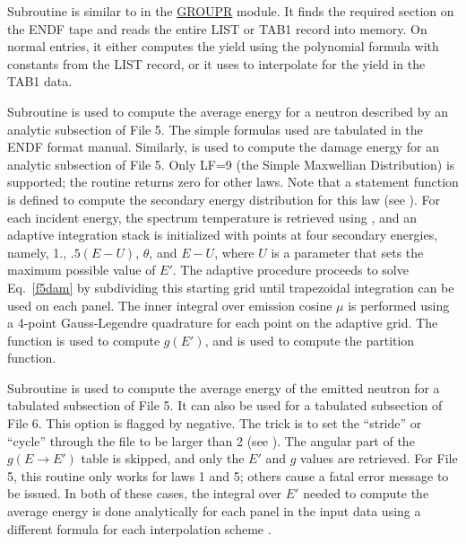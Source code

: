 Subroutine  is
similar to  in the
\hyperlink{sGROUPRhy}{GROUPR}
module.  It finds the required section on
the ENDF tape and reads the entire LIST or TAB1 record into
memory.  On normal entries, it either computes the yield using the
polynomial formula with constants from the LIST record, or
it uses  to interpolate for
the yield in the TAB1 data.

Subroutine 
is used to compute the average energy for a neutron described
by an analytic subsection of File 5.  The simple formulas
used are tabulated in the ENDF format manual\cite{ENDF102}.
Similarly,  is used to
compute the damage energy for an analytic subsection of File 5.
Only LF=9 (the Simple Maxwellian Distribution) is supported; the
routine returns zero for other laws.  Note that a statement function
is defined to compute the secondary energy distribution for
this law (see ).  For each incident energy, the
spectrum temperature  is retrieved using
, and an adaptive integration stack is
initialized with points at four secondary energies,
namely, 1., $.5(E{-}U)$, $\theta$, and $E{-}U$, where $U$ is
a parameter that sets the maximum possible value of $E'$.
The adaptive procedure proceeds to solve Eq.~\ref{f5dam}
by subdividing this starting grid until trapezoidal integration
can be used on each panel.  The inner integral over emission
cosine $\mu$ is performed using a 4-point Gauss-Legendre
quadrature for each point on the adaptive grid.  The
function  is used to compute $g(E')$, and
 is used to compute the
partition function.

Subroutine 
is used to compute the average energy of the emitted neutron
for a tabulated subsection of File 5.  It can also be used
for a tabulated subsection of File 6.  This option is
flagged by  negative.  The trick is to set
the ``stride'' or ``cycle'' through the file to be larger
than 2 (see ).  The angular part of the
$g(E{\rightarrow}E')$ table is skipped, and only the $E'$ and
$g$ values are retrieved.  For File 5, this routine only works
for laws 1 and 5; others cause a fatal error message to be
issued.  In both of these cases, the integral over $E'$ needed
to compute the average energy is done analytically for each
panel in the input data using a different formula for each
interpolation scheme .

